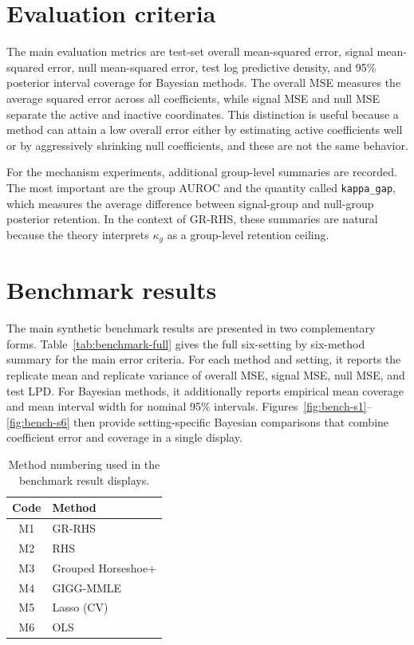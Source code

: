 \documentclass[11pt]{article}
\begin{document}
\section{Evaluation criteria}

The main evaluation metrics are test-set overall mean-squared error, signal
mean-squared error, null mean-squared error, test log predictive density, and
95\% posterior interval coverage for Bayesian methods. The overall MSE measures
the average squared error across all coefficients, while signal MSE and null MSE
separate the active and inactive coordinates. This distinction is useful because
a method can attain a low overall error either by estimating active
coefficients well or by aggressively shrinking null coefficients, and these are
not the same behavior.

For the mechanism experiments, additional group-level summaries are recorded.
The most important are the group AUROC and the quantity called
\texttt{kappa\_gap}, which measures the average difference between signal-group
and null-group posterior retention. In the context of GR-RHS, these summaries
are natural because the theory interprets \(\kappa_g\) as a group-level
retention ceiling.

\section{Benchmark results}

The main synthetic benchmark results are presented in two complementary forms.
Table~\ref{tab:benchmark-full} gives the full six-setting by six-method summary
for the main error criteria. For each method and setting, it reports the
replicate mean and replicate variance of overall MSE, signal MSE, null MSE,
and test LPD. For Bayesian methods, it additionally reports empirical mean
coverage and mean interval width for nominal 95\% intervals.
Figures~\ref{fig:bench-s1}--\ref{fig:bench-s6} then provide setting-specific
Bayesian comparisons that combine coefficient error and coverage in a single
display.

\begin{table}[H]
\centering
\caption{Method numbering used in the benchmark result displays.}
\label{tab:method-index}
\begin{tabular}{cl}
\toprule
Code & Method \\
\midrule
M1 & GR-RHS \\
M2 & RHS \\
M3 & Grouped Horseshoe+ \\
M4 & GIGG-MMLE \\
M5 & Lasso (CV) \\
M6 & OLS \\
\bottomrule
\end{tabular}
\end{table}
\end{document}
